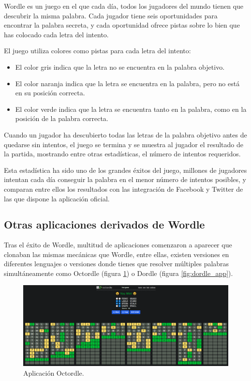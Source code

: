 Wordle es un juego en el que cada día, todos los jugadores del mundo tienen que descubrir la misma palabra.
Cada jugador tiene seis oportunidades para encontrar la palabra secreta, y cada oportunidad ofrece pistas sobre lo bien que has colocado cada letra del intento.

El juego utiliza colores como pistas para cada letra del intento:
\begin{itemize}
	\item El color gris indica que la letra no se encuentra en la palabra objetivo.
	\item El color naranja indica que la letra se encuentra en la palabra, pero no está en su posición correcta.
	\item El color verde indica que la letra se encuentra tanto en la palabra, como en la posición de la palabra correcta.
\end{itemize}

Cuando un jugador ha descubierto todas las letras de la palabra objetivo antes de quedarse sin intentos, el juego se termina y se muestra al jugador el resultado de la partida, mostrando entre otras estadísticas, el número de intentos requeridos.

Esta estadística ha sido uno de los grandes éxitos del juego, millones de jugadores intentan cada día conseguir la palabra en el menor número de intentos posibles, y comparan entre ellos los resultados con las integración de Facebook y Twitter de las que dispone la aplicación oficial.


\subsection{Otras aplicaciones derivados de Wordle}

Tras el éxito de Wordle, multitud de aplicaciones comenzaron a aparecer que clonaban las mismas mecánicas que Wordle, entre ellas, existen versiones en diferentes lenguajes o versiones donde tienes que resolver múltiples palabras simultáneamente como Octordle (figura \ref{fig:octordle_app}) o Dordle (figura \ref{fig:dordle_app}).


\begin{figure}
	\centering
	\includegraphics[clip=true,width=\textwidth]{images/octordle.png}
	\caption{Aplicación Octordle.}
	\label{fig:octordle_app}
\end{figure}


